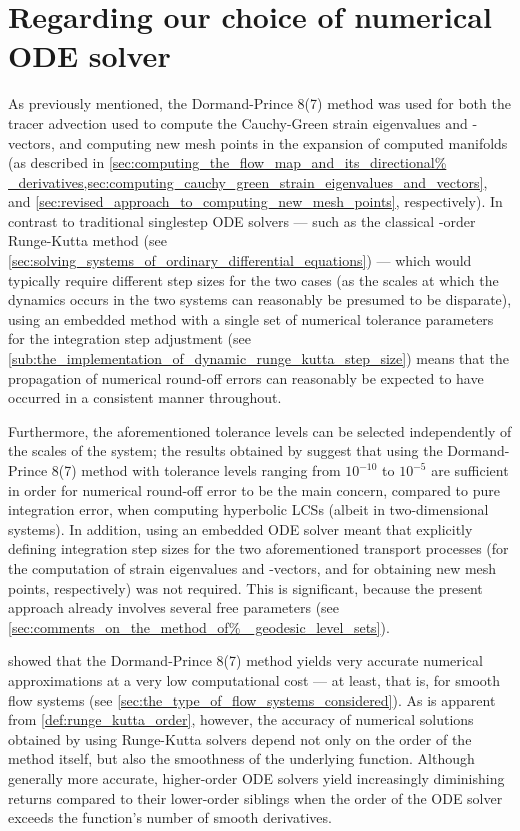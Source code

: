 \section{Regarding our choice of numerical ODE solver}
\label{sec:regarding_our_choice_of_numerical_ode_solver}

As previously mentioned, the Dormand-Prince 8(7) method was used for both the
tracer advection used to compute the Cauchy-Green strain eigenvalues and
-vectors, and computing new mesh points in the expansion of computed manifolds
(as described in \cref{sec:computing_the_flow_map_and_its_directional%
_derivatives,sec:computing_cauchy_green_strain_eigenvalues_and_vectors}, and
\cref{sec:revised_approach_to_computing_new_mesh_points}, respectively).
In contrast to traditional singlestep ODE solvers --- such as the classical
-order Runge-Kutta method (see
\cref{sec:solving_systems_of_ordinary_differential_equations}) --- which would
typically require different step sizes for the two cases (as the scales at which
the dynamics occurs in the two systems can reasonably be presumed to be
disparate), using an embedded method with a single set of numerical tolerance
parameters for the integration step adjustment (see
\cref{sub:the_implementation_of_dynamic_runge_kutta_step_size}) means that the
propagation of numerical round-off errors can reasonably be expected to have
occurred in a consistent manner throughout.

Furthermore, the aforementioned tolerance levels can be selected independently
of the scales of the system; the results obtained by
\textcite{loken2017sensitivity} suggest that using the Dormand-Prince 8(7)
method with tolerance levels ranging from $10^{-10}$ to $10^{-5}$ are
sufficient in order for numerical round-off error to be the main
concern, compared to pure integration error, when computing hyperbolic LCSs
(albeit in two-dimensional systems). In addition, using an embedded ODE
solver meant that explicitly defining integration step sizes for the
two aforementioned transport processes (for the computation of strain
eigenvalues and -vectors, and for obtaining new mesh points, respectively) was
not required. This is significant, because the present approach already
involves several free parameters (see \cref{sec:comments_on_the_method_of%
_geodesic_level_sets}).

\textcite{loken2017sensitivity} showed that the Dormand-Prince 8(7) method
yields very accurate numerical approximations at a very low computational cost
--- at least, that is, for smooth flow systems (see
\cref{sec:the_type_of_flow_systems_considered}). As is apparent from
\cref{def:runge_kutta_order}, however, the accuracy of numerical solutions
obtained by using Runge-Kutta solvers depend not only on the order of the
method itself, but also the smoothness of the underlying function. Although
generally more accurate, higher-order ODE solvers yield increasingly
diminishing returns compared to their lower-order siblings when the order of
the ODE solver exceeds the function's number of smooth derivatives.

